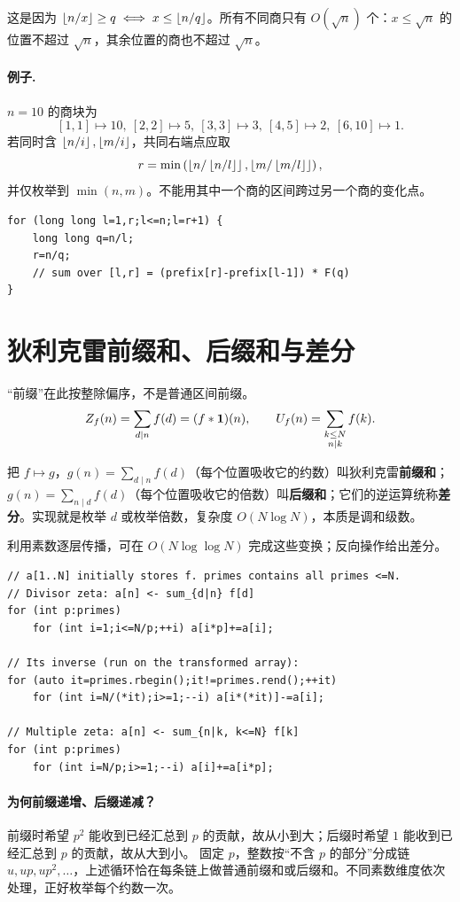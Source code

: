 这是因为 $\left\lfloor n/x\right\rfloor\ge q\iff x\le\left\lfloor n/q\right\rfloor$。所有不同商只有 $O(\sqrt n)$ 个：$x\le\sqrt n$ 的位置不超过 $\sqrt n$，其余位置的商也不超过 $\sqrt n$。

\paragraph{例子.} $n=10$ 的商块为
\[
[1,1]\mapsto10,\ [2,2]\mapsto5,\ [3,3]\mapsto3,\ [4,5]\mapsto2,\ [6,10]\mapsto1.
\]
若同时含 $\left\lfloor n/i\right\rfloor,\left\lfloor m/i\right\rfloor$，共同右端点应取
\[
 r=\min\left(\left\lfloor n/\left\lfloor n/l\right\rfloor\right\rfloor,\left\lfloor m/\left\lfloor m/l\right\rfloor\right\rfloor\right),
\]
并仅枚举到 $\min(n,m)$。不能用其中一个商的区间跨过另一个商的变化点。
\begin{lstlisting}
for (long long l=1,r;l<=n;l=r+1) {
    long long q=n/l;
    r=n/q;
    // sum over [l,r] = (prefix[r]-prefix[l-1]) * F(q)
}
\end{lstlisting}


\section{狄利克雷前缀和、后缀和与差分}
“前缀”在此按整除偏序，不是普通区间前缀。
\[
 Z_f(n)=\sum_{d\mid n}f(d)=(f*\mathbf 1)(n),\qquad
 U_f(n)=\sum_{\substack{k\le N\\n\mid k}}f(k).
\]

\begin{tip}[这三个词在说什么]
把 $f\mapsto g$，$g(n)=\sum_{d\mid n}f(d)$（每个位置吸收它的约数）叫狄利克雷\textbf{前缀和}；$g(n)=\sum_{n\mid d}f(d)$（每个位置吸收它的倍数）叫\textbf{后缀和}；它们的逆运算统称\textbf{差分}。实现就是枚举 $d$ 或枚举倍数，复杂度 $O(N\log N)$，本质是调和级数。
\end{tip}

利用素数逐层传播，可在 $O(N\log\log N)$ 完成这些变换；反向操作给出差分。


\begin{lstlisting}
// a[1..N] initially stores f. primes contains all primes <=N.
// Divisor zeta: a[n] <- sum_{d|n} f[d]
for (int p:primes)
    for (int i=1;i<=N/p;++i) a[i*p]+=a[i];

// Its inverse (run on the transformed array):
for (auto it=primes.rbegin();it!=primes.rend();++it)
    for (int i=N/(*it);i>=1;--i) a[i*(*it)]-=a[i];

// Multiple zeta: a[n] <- sum_{n|k, k<=N} f[k]
for (int p:primes)
    for (int i=N/p;i>=1;--i) a[i]+=a[i*p];
\end{lstlisting}
\paragraph{为何前缀递增、后缀递减？}
前缀时希望 $p^2$ 能收到已经汇总到 $p$ 的贡献，故从小到大；后缀时希望 $1$ 能收到已经汇总到 $p$ 的贡献，故从大到小。
固定 $p$，整数按“不含 $p$ 的部分”分成链 $u,up,up^2,\ldots$，上述循环恰在每条链上做普通前缀和或后缀和。不同素数维度依次处理，正好枚举每个约数一次。

